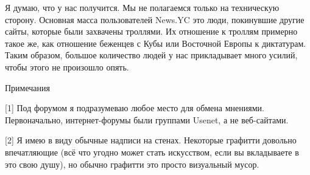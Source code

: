 \documentclass[ebook,12pt,oneside,openany]{memoir}
\begin{document}
Я думаю, что у нас получится. Мы не полагаемся только на техническую
сторону. Основная масса пользователей News.YC это люди, покинувшие
другие сайты, которые были захвачены троллями. Их отношение к троллям
примерно такое же, как отношение беженцев с Кубы или Восточной Европы
к диктатурам. Таким образом, большое количество людей у нас
прикладывает много усилий, чтобы этого не произошло опять.

Примечания

[1] Под форумом я подразумеваю любое место для обмена мнениями.
Первоначально, интернет-форумы были группами Usenet, а не веб-сайтами.

[2] Я имею в виду обычные надписи на стенах. Некоторые графитти
довольно впечатляющие (всё что угодно может стать искусством, если вы
вкладываете в это свою душу), но обычно графитти это просто визуальный
мусор.
\end{document}
